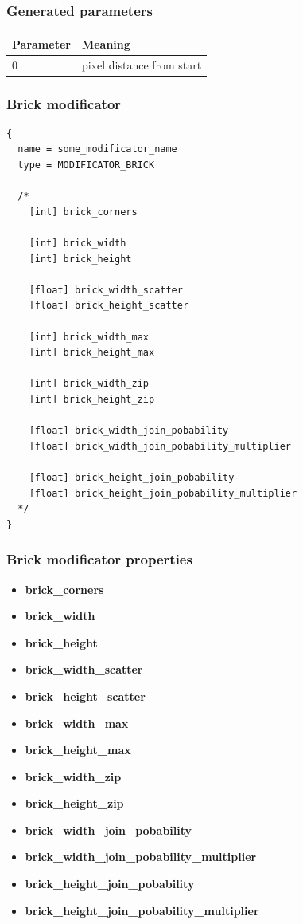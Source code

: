 \documentclass[9pt]{article}
\begin{document}
\subsubsection*{Generated parameters}

\begin{tabular}{|l||l|}
\hline
  Parameter & Meaning \\
\hline  
  0 & pixel distance from start \\
\hline
\end{tabular}

\subsubsection{Brick modificator}

\begin{verbatim}
{
  name = some_modificator_name
  type = MODIFICATOR_BRICK

  /*
    [int] brick_corners
        
    [int] brick_width
    [int] brick_height
        
    [float] brick_width_scatter
    [float] brick_height_scatter
        
    [int] brick_width_max
    [int] brick_height_max
        
    [int] brick_width_zip
    [int] brick_height_zip
        
    [float] brick_width_join_pobability
    [float] brick_width_join_pobability_multiplier
        
    [float] brick_height_join_pobability
    [float] brick_height_join_pobability_multiplier
  */
}
\end{verbatim}
\subsubsection*{Brick modificator properties}
\begin{itemize}
\item{\bf brick\_corners}
\item{\bf brick\_width}
\item{\bf brick\_height}
\item{\bf brick\_width\_scatter}
\item{\bf brick\_height\_scatter}
\item{\bf brick\_width\_max}
\item{\bf brick\_height\_max}
\item{\bf brick\_width\_zip}
\item{\bf brick\_height\_zip}
\item{\bf brick\_width\_join\_pobability}
\item{\bf brick\_width\_join\_pobability\_multiplier}
\item{\bf brick\_height\_join\_pobability}
\item{\bf brick\_height\_join\_pobability\_multiplier}
\end{itemize}
\end{document}
